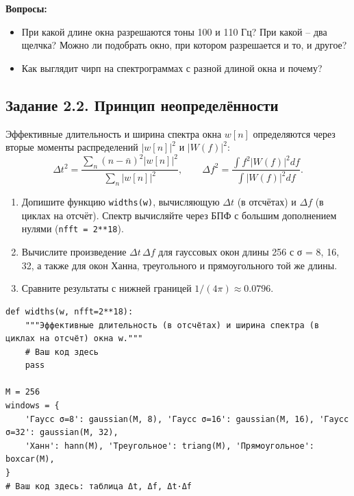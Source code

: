 \documentclass[12pt,a4paper,openany]{book}
\providecommand{\tightlist}{\setlength{\itemsep}{0pt}\setlength{\parskip}{0pt}}
\begin{document}
\textbf{Вопросы:}

\begin{itemize}
\tightlist
\item
  При какой длине окна разрешаются тоны 100 и 110 Гц? При какой -- два щелчка? Можно ли подобрать окно, при котором разрешается и то, и другое?
\item
  Как выглядит чирп на спектрограммах с разной длиной окна и почему?
\end{itemize}

\subsection*{Задание 2.2. Принцип неопределённости}

Эффективные длительность и ширина спектра окна \(w[n]\) определяются через вторые моменты распределений \(|w[n]|^2\) и \(|W(f)|^2\):
\[
\Delta t^2 = \frac{\sum_n (n - \bar n)^2 |w[n]|^2}{\sum_n |w[n]|^2}, \qquad
\Delta f^2 = \frac{\int f^2 |W(f)|^2 df}{\int |W(f)|^2 df}.
\]

\begin{enumerate}
\def\labelenumi{\arabic{enumi}.}
\tightlist
\item
  Допишите функцию \texttt{widths(\allowbreak{}w)}, вычисляющую \(\Delta t\) (в отсчётах) и \(\Delta f\) (в циклах на отсчёт). Спектр вычисляйте через БПФ с большим дополнением нулями (\texttt{nfft\ =\allowbreak{}\ 2**18}).
\item
  Вычислите произведение \(\Delta t\,\Delta f\) для гауссовых окон длины 256 с σ = 8, 16, 32, а также для окон Ханна, треугольного и прямоугольного той же длины.
\item
  Сравните результаты с нижней границей \(1/(4\pi) \approx 0.0796\).
\end{enumerate}

\begin{Verbatim}[fontsize=\small, breaklines, breakanywhere, frame=single, framesep=2mm]
def widths(w, nfft=2**18):
    """Эффективные длительность (в отсчётах) и ширина спектра (в циклах на отсчёт) окна w."""
    # Ваш код здесь
    pass

M = 256
windows = {
    'Гаусс σ=8': gaussian(M, 8), 'Гаусс σ=16': gaussian(M, 16), 'Гаусс σ=32': gaussian(M, 32),
    'Ханн': hann(M), 'Треугольное': triang(M), 'Прямоугольное': boxcar(M),
}
# Ваш код здесь: таблица Δt, Δf, Δt·Δf
\end{Verbatim}
\end{document}
